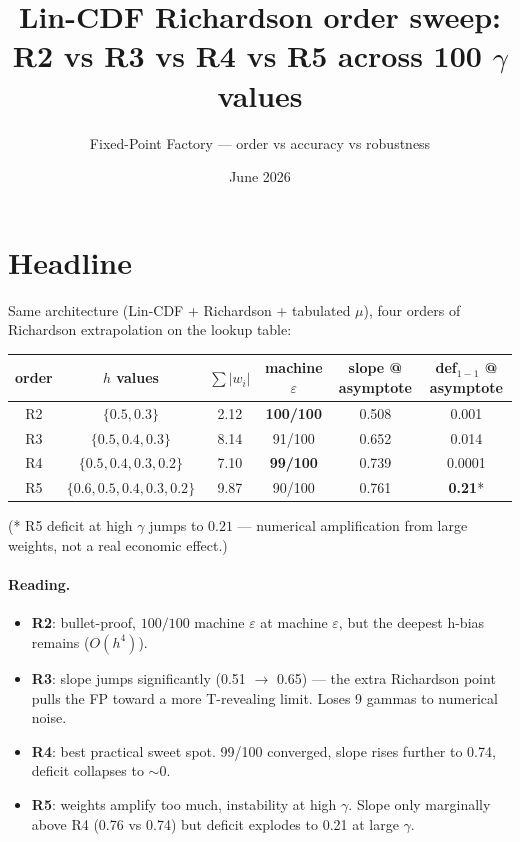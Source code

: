 \documentclass[11pt]{article}
\title{Lin-CDF Richardson order sweep:\\
       R2 vs R3 vs R4 vs R5 across 100 $\gamma$ values}
\author{Fixed-Point Factory --- order vs accuracy vs robustness}
\date{June 2026}
\begin{document}
\maketitle

\section*{Headline}

Same architecture (Lin-CDF + Richardson + tabulated $\mu$), four orders
of Richardson extrapolation on the lookup table:

\begin{center}
\begin{tabular}{cccccc}
\toprule
order & $h$ values & $\sum |w_i|$ & machine $\varepsilon$ & slope @ asymptote & def$_{1{-}1}$ @ asymptote \\
\midrule
R2 & $\{0.5, 0.3\}$ & 2.12 & \textbf{100/100} & 0.508 & 0.001 \\
R3 & $\{0.5, 0.4, 0.3\}$ & 8.14 & 91/100 & 0.652 & 0.014 \\
R4 & $\{0.5, 0.4, 0.3, 0.2\}$ & 7.10 & \textbf{99/100} & 0.739 & 0.0001 \\
R5 & $\{0.6, 0.5, 0.4, 0.3, 0.2\}$ & 9.87 & 90/100 & 0.761 & \textbf{0.21}* \\
\bottomrule
\end{tabular}
\end{center}

(* R5 deficit at high $\gamma$ jumps to $0.21$ --- numerical
amplification from large weights, not a real economic effect.)

\paragraph{Reading.}
\begin{itemize}
  \item \textbf{R2}: bullet-proof, $100/100$ machine $\varepsilon$ at
        machine $\varepsilon$, but the deepest h-bias remains ($O(h^4)$).
  \item \textbf{R3}: slope jumps significantly (0.51 $\to$ 0.65) — the
        extra Richardson point pulls the FP toward a more
        T-revealing limit. Loses 9 gammas to numerical noise.
  \item \textbf{R4}: best practical sweet spot. 99/100 converged,
        slope rises further to 0.74, deficit collapses to $\sim 0$.
  \item \textbf{R5}: weights amplify too much, instability at high $\gamma$.
        Slope only marginally above R4 (0.76 vs 0.74) but deficit
        explodes to 0.21 at large $\gamma$.
\end{itemize}
\end{document}
